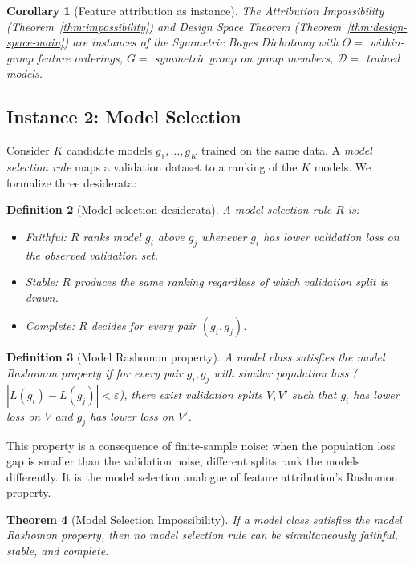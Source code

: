 \documentclass{article}
\newtheorem{theorem}{Theorem}
\newtheorem{corollary}[theorem]{Corollary}
\newtheorem{definition}[theorem]{Definition}
\begin{document}
\begin{corollary}[Feature attribution as instance]
\label{cor:attribution-instance}
The Attribution Impossibility (Theorem~\ref{thm:impossibility}) and Design Space Theorem (Theorem~\ref{thm:design-space-main}) are instances of the Symmetric Bayes Dichotomy with $\Theta =$ within-group feature orderings, $G =$ symmetric group on group members, $\mathcal{D} =$ trained models.
\end{corollary}

\subsection{Instance 2: Model Selection}

Consider $K$ candidate models $g_1, \ldots, g_K$ trained on the same data. A \emph{model selection rule} maps a validation dataset to a ranking of the $K$ models. We formalize three desiderata:

\begin{definition}[Model selection desiderata]
A model selection rule $R$ is:
\begin{itemize}
    \item \emph{Faithful}: $R$ ranks model $g_i$ above $g_j$ whenever $g_i$ has lower validation loss on the observed validation set.
    \item \emph{Stable}: $R$ produces the same ranking regardless of which validation split is drawn.
    \item \emph{Complete}: $R$ decides for every pair $(g_i, g_j)$.
\end{itemize}
\end{definition}

\begin{definition}[Model Rashomon property]
A model class satisfies the \emph{model Rashomon property} if for every pair $g_i, g_j$ with similar population loss ($|L(g_i) - L(g_j)| < \varepsilon$), there exist validation splits $V, V'$ such that $g_i$ has lower loss on $V$ and $g_j$ has lower loss on $V'$.
\end{definition}

This property is a consequence of finite-sample noise: when the population loss gap is smaller than the validation noise, different splits rank the models differently. It is the model selection analogue of feature attribution's Rashomon property.

\begin{theorem}[Model Selection Impossibility]
\label{thm:model-selection}
If a model class satisfies the model Rashomon property, then no model selection rule can be simultaneously faithful, stable, and complete.
\end{theorem}
\end{document}
